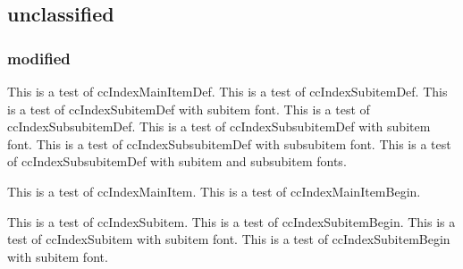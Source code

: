 \documentclass{article}
\begin{document}
{{{{\subsection{unclassified }
\subsubsection{modified}
This is a test of ccIndexMainItemDef.
This is a test of ccIndexSubitemDef.
This is a test of ccIndexSubitemDef with subitem font.
This is a test of ccIndexSubsubitemDef.
This is a test of ccIndexSubsubitemDef with subitem font.
This is a test of ccIndexSubsubitemDef with subsubitem font.
This is a test of ccIndexSubsubitemDef with subitem and subsubitem fonts.

\pagebreak

This is a test of ccIndexMainItem.
This is a test of ccIndexMainItemBegin.

This is a test of ccIndexSubitem.
This is a test of ccIndexSubitemBegin.
This is a test of ccIndexSubitem with subitem font.
This is a test of ccIndexSubitemBegin with subitem font.

}}}}
\end{document}
